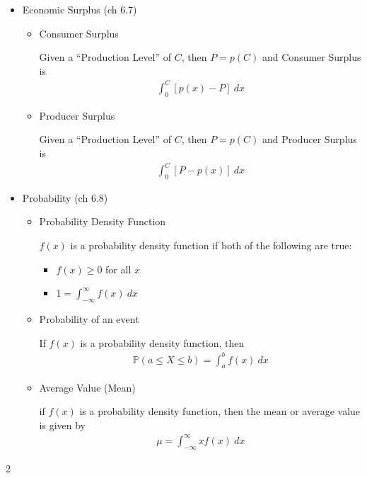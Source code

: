 \documentclass{report}
\begin{document}
\begin{multicols}{2}
\begin{itemize}[leftmargin=.25cm]
\item Economic Surplus (ch 6.7)
\begin{itemize}[leftmargin=.25cm]
\item Consumer Surplus

Given a ``Production Level'' of $ C $, then $ P = p(C) $ and Consumer Surplus is
\begin{align*}
\int_0^C \left[ p(x) - P \right] \ dx
\end{align*}


\item Producer Surplus

Given a ``Production Level'' of $ C $, then $ P = p(C) $ and Producer Surplus is
\begin{align*}
\int_0^C \left[ P - p(x) \right] \ dx
\end{align*}
\end{itemize}




\item Probability (ch 6.8)
\begin{itemize}[leftmargin=.25cm]
\item Probability Density Function

$ f(x) $ is a probability density function if both of the following are true:
\begin{itemize}[leftmargin=.25cm]
\item $ f(x) \geq 0 $ for all $ x $
\item $ 1 = \int_{-\infty}^{\infty} f(x) \ dx $


\end{itemize}
\item Probability of an event

If $ f(x) $ is a probability density function, then
\begin{align*}
\mathbb{P} \left( a \leq X \leq b \right) = \int_a^b f(x) \ dx
\end{align*}


\item Average Value (Mean)

if $ f(x) $ is a probability density function, then the mean or average value is given by
\begin{align*}
\mu = \int_{-\infty}^{\infty} x f(x) \ dx
\end{align*}
\end{itemize}





\end{itemize}
\vfill
\end{multicols}{2}
\end{document}
